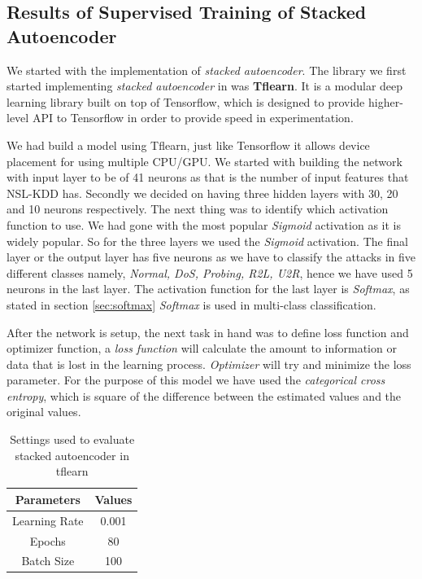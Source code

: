 \documentclass[12pt, a4paper]{report}
\begin{document}
\begin{appendices}
  \chapter{Results of Supervised Training of Stacked Autoencoder}\label{app:super}
 We started with the implementation of \textit{stacked autoencoder}. The library we first started implementing \textit{stacked autoencoder} in was \textbf{Tflearn}. It is a modular deep learning library built on top of Tensorflow, which is designed to provide higher-level API to Tensorflow in order to provide speed in experimentation.\\ \par

We had build a model using Tflearn, just like Tensorflow it allows device placement for using multiple CPU/GPU. We started with building the network with input layer to be of 41 neurons as that is the number of input features that NSL-KDD has. Secondly we decided on having three hidden layers with 30, 20 and 10 neurons respectively. The next thing was to identify which activation function to use. We had gone with the most popular \textit{Sigmoid} activation as it is widely popular. So for the three layers we used the \textit{Sigmoid} activation. The final layer or the output layer has five neurons as we have to classify the attacks in five different classes namely, \textit{Normal, DoS, Probing, R2L, U2R}, hence we have used 5 neurons in the last layer. The activation function for the last layer is \textit{Softmax}, as stated in section \ref{sec:softmax} \textit{Softmax} is used in multi-class classification.\\ \par

After the network is setup, the next task in hand was to define loss function and optimizer function, a \textit{loss function} will calculate the amount to information or data that is lost in the learning process. \textit{Optimizer} will try and minimize the loss parameter. For the purpose of this model we have used the \textit{categorical cross entropy}, which is square of the difference between the estimated values and the original values. \\ \par
\begin{table}[ht]
\centering
\captionsetup{justification=centering,margin=2cm}
\begin{tabular}{|c|c|}
\hline
\textbf{Parameters} & \textbf{Values} \\ \hline
Learning Rate       & 0.001           \\ \hline
Epochs              & 80              \\ \hline
Batch Size          & 100             \\ \hline
\end{tabular}
\caption{Settings used to evaluate stacked autoencoder in tflearn}
\label{setting_tflearn_autoencoder}
\end{table}
\clearpage

\end{appendices}
\end{document}
